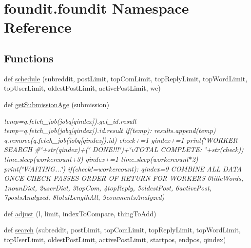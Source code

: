 \hypertarget{namespacefoundit_1_1foundit}{}\section{foundit.\+foundit Namespace Reference}
\label{namespacefoundit_1_1foundit}
\subsection*{Functions}
\begin{DoxyCompactItemize}
\item 
def \hyperlink{namespacefoundit_1_1foundit_a417cf87b2677c1439ee12bab5e23124e}{schedule} (subreddit, post\+Limit, top\+Com\+Limit, top\+Reply\+Limit, top\+Word\+Limit, top\+User\+Limit, oldest\+Post\+Limit, active\+Post\+Limit, wc)
\item 
def \hyperlink{namespacefoundit_1_1foundit_a8904e5a32351d54fbbc0971b30424e6c}{get\+Submission\+Age} (submission)
\begin{DoxyCompactList}\small\item\em temp=q.\+fetch\+\_\+job(jobq\mbox{[}qindex\mbox{]}).get\+\_\+id.\+result temp=q.\+fetch\+\_\+job(jobq\mbox{[}qindex\mbox{]}).id.\+result if(temp)\+: results.\+append(temp) q.\+remove(q.\+fetch\+\_\+job(jobq\mbox{[}qindex\mbox{]}).id) check+=1 gindex+=1 print(\char`\"{}\+W\+O\+R\+K\+E\+R S\+E\+A\+R\+C\+H \#\char`\"{}+str(qindex)+(\char`\"{} D\+O\+N\+E!!!\char`\"{})+\char`\"{}v\+T\+O\+T\+A\+L C\+O\+M\+P\+L\+E\+T\+E\+: \char`\"{}+str(check)) time.\+sleep(workercount+3) qindex+=1 time.\+sleep(workercount$\ast$2) print(\char`\"{}\+W\+A\+I\+T\+I\+N\+G...\char`\"{}) if(check!=workercount)\+: qindex=0 C\+O\+M\+B\+I\+NE A\+LL D\+A\+TA O\+N\+CE C\+H\+E\+CK P\+A\+S\+S\+ES O\+R\+D\+ER OF R\+E\+T\+U\+RN F\+OR W\+O\+R\+K\+E\+RS 0title\+Words, 1noun\+Dict, 2user\+Dict, 3top\+Com, 4top\+Reply, 5oldest\+Post, 6active\+Post, 7posts\+Analyzed, 8total\+Length\+All, 9comments\+Analyzed) \end{DoxyCompactList}\item 
def \hyperlink{namespacefoundit_1_1foundit_ae5d1e300e19274d4bb4c0db668d13714}{adjust} (l, limit, index\+To\+Compare, thing\+To\+Add)
\item 
def \hyperlink{namespacefoundit_1_1foundit_a0a97ddadcb8a2cc47d44c8810dc8af05}{search} (subreddit, post\+Limit, top\+Com\+Limit, top\+Reply\+Limit, top\+Word\+Limit, top\+User\+Limit, oldest\+Post\+Limit, active\+Post\+Limit, startpos, endpos, qindex)
\end{DoxyCompactItemize}
